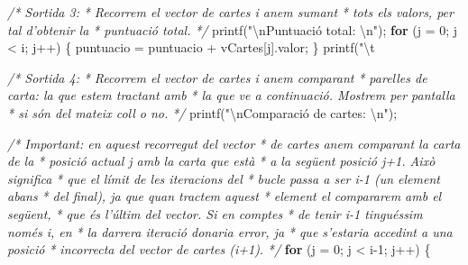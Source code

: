 \documentclass[]{book}
\newenvironment{Shaded}{\begin{snugshade}}{\end{snugshade}}
\newcommand{\DecValTok}[1]{\textcolor[rgb]{0.00,0.00,0.81}{#1}}
\newcommand{\SpecialCharTok}[1]{\textcolor[rgb]{0.00,0.00,0.00}{#1}}
\newcommand{\StringTok}[1]{\textcolor[rgb]{0.31,0.60,0.02}{#1}}
\newcommand{\CommentTok}[1]{\textcolor[rgb]{0.56,0.35,0.01}{\textit{#1}}}
\newcommand{\ControlFlowTok}[1]{\textcolor[rgb]{0.13,0.29,0.53}{\textbf{#1}}}
\newcommand{\NormalTok}[1]{#1}
\begin{document}
\begin{Shaded}
\begin{Highlighting}[]
{{{{    \CommentTok{/* Sortida 3:}
\CommentTok{     * Recorrem el vector de cartes i anem sumant}
\CommentTok{     * tots els valors, per tal d'obtenir la }
\CommentTok{     * puntuació total.}
\CommentTok{     */}
\NormalTok{    printf(}\StringTok{"}\SpecialCharTok{\textbackslash{}n}\StringTok{Puntuació total: }\SpecialCharTok{\textbackslash{}n}\StringTok{"}\NormalTok{);}
    \ControlFlowTok{for}\NormalTok{ (j = }\DecValTok{0}\NormalTok{; j < i; j++) \{}
\NormalTok{        puntuacio = puntuacio + vCartes[j].valor;}
\NormalTok{    \}}
\NormalTok{    printf(}\StringTok{"}\SpecialCharTok{\textbackslash{}t}\StringTok{%
    
    \CommentTok{/* Sortida 4:}
\CommentTok{     * Recorrem el vector de cartes i anem comparant}
\CommentTok{     * parelles de carta: la que estem tractant amb}
\CommentTok{     * la que ve a continuació. Mostrem per pantalla}
\CommentTok{     * si són del mateix coll o no.}
\CommentTok{     */}
\NormalTok{    printf(}\StringTok{"}\SpecialCharTok{\textbackslash{}n}\StringTok{Comparació de cartes: }\SpecialCharTok{\textbackslash{}n}\StringTok{"}\NormalTok{);}
    
    \CommentTok{/* Important: en aquest recorregut del vector}
\CommentTok{     * de cartes anem comparant la carta de la }
\CommentTok{     * posició actual j amb la carta que està}
\CommentTok{     * a la següent posició j+1. Això significa}
\CommentTok{     * que el límit de les iteracions del }
\CommentTok{     * bucle passa a ser i-1 (un element abans}
\CommentTok{     * del final), ja que quan tractem aquest}
\CommentTok{     * element el compararem amb el següent,}
\CommentTok{     * que és l'últim del vector. Si en comptes}
\CommentTok{     * de tenir i-1 tinguéssim només i, en }
\CommentTok{     * la darrera iteració donaria error, ja }
\CommentTok{     * que s'estaria accedint a una posició}
\CommentTok{     * incorrecta del vector de cartes (i+1).}
\CommentTok{     */}
    \ControlFlowTok{for}\NormalTok{ (j = }\DecValTok{0}\NormalTok{; j < i-}\DecValTok{1}\NormalTok{; j++) \{}
        
}}}}}
\end{Highlighting}
\end{Shaded}
\end{document}
